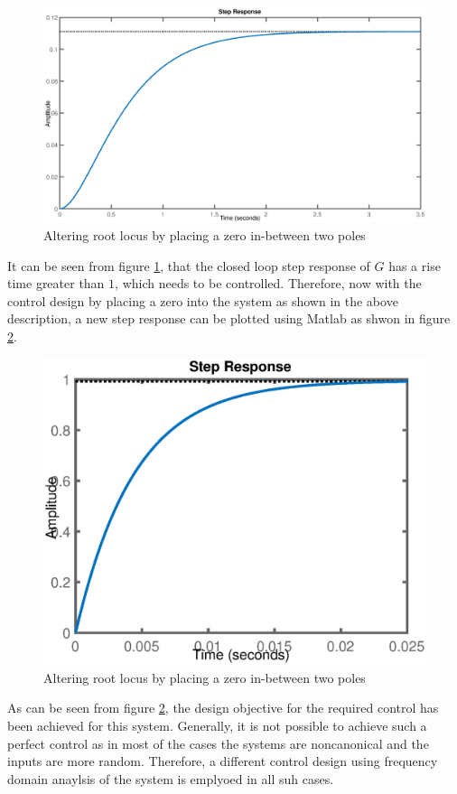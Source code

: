 \begin{figure}[h!]
	\centering
	\includegraphics[width=\linewidth]{Bilder/RootLocus_ControlDesign_SysResp.eps}
	\caption{Altering root locus by placing a zero in-between two poles}
	\label{Fig_RootLocus_ControlDesign_SysResp}
\end{figure}
\newpage
It can be seen from figure \ref{Fig_RootLocus_ControlDesign_SysResp}, that the closed loop step response of $G$ has a rise time greater than $1$, which needs to be controlled. Therefore, now with the control design by placing a zero into the system as shown in the above description, a new step response can be plotted using Matlab as shwon in figure \ref{Fig_RootLocus_ControlDesign_SysResp_C}.
\begin{figure}[h!]
	\centering
	\includegraphics[width=\linewidth]{Bilder/RootLocus_ControlDesign_SysResp_C.eps}
	\caption{Altering root locus by placing a zero in-between two poles}
	\label{Fig_RootLocus_ControlDesign_SysResp_C}
\end{figure}
\newpage
As can be seen from figure \ref{Fig_RootLocus_ControlDesign_SysResp_C}, the design objective for the required control has been achieved for this system. Generally, it is not possible to achieve such a perfect control as in most of the cases the systems are noncanonical and the inputs are more random. Therefore, a different control design using frequency domain anaylsis of the system is emplyoed in all suh cases.


